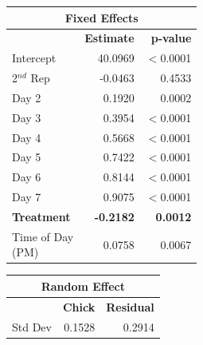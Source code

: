 \documentclass[a4paper, 10pt, titlepage]{article}
\newcommand\Tstrut{\rule{0pt}{2.9ex}}         %
\newcommand\Bstrut{\rule[-1.2ex]{0pt}{0pt}}   %
\begin{document}
\begin{table}[ht]
\centering
{} 
\begin{tabular}[t]{lrr}
 \hline
 \multicolumn{3}{c}{\textbf{Fixed Effects}}\\
 \hline
 & \textbf{Estimate} & \textbf{p-value}\Tstrut\\ 
 Intercept & 40.0969 & $<$0.0001\\
 2$^{nd}$ Rep & -0.0463 & 0.4533\\
 Day 2 & 0.1920 & 0.0002\\
 Day 3 & 0.3954 & $<$0.0001\\
 Day 4 & 0.5668 & $<$0.0001\\
 Day 5 & 0.7422 & $<$0.0001\\
 Day 6 & 0.8144 & $<$0.0001\\
 Day 7 & 0.9075 & $<$0.0001\\
 \textbf{Treatment} & \textbf{-0.2182} & \textbf{0.0012}\\
 \makecell[l]{Time of Day \\ (PM)\Bstrut} & 0.0758 & 0.0067\\
 \hline
\end{tabular}
\quad
\begin{tabular}[t]{lrr}
 \hline
\multicolumn{3}{c}{\textbf{Random Effect}}\\
 \hline
 & \textbf{Chick} & \textbf{Residual}\Tstrut \\ 
 Std Dev & 0.1528 & 0.2914\Bstrut\\
 \hline
\end{tabular}
\label{table:Est 85 R}
\end{table}
\end{document}
